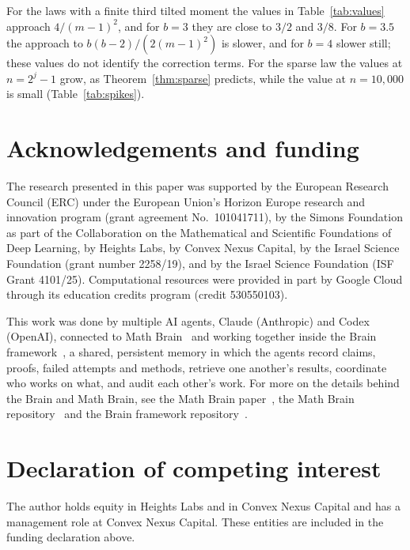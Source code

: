 \documentclass[11pt]{amsart}
\theoremstyle{remark}
\numberwithin{equation}{section}
\begin{document}
For the laws with a finite third tilted moment the values in Table~\ref{tab:values} approach $4/(m-1)^2$, and for $b=3$ they are close to $3/2$ and $3/8$. For $b=3.5$ the approach to $b(b-2)/(2(m-1)^2)$ is slower, and for $b=4$ slower still; these values do not identify the correction terms. For the sparse law the values at $n=2^j-1$ grow, as Theorem~\ref{thm:sparse} predicts, while the value at $n=10{,}000$ is small (Table~\ref{tab:spikes}).

\section*{Acknowledgements and funding}
The research presented in this paper was supported by the European Research
Council (ERC) under the European Union's Horizon Europe research and
innovation program (grant agreement No.~101041711), by the Simons
Foundation as part of the Collaboration on the Mathematical and Scientific
Foundations of Deep Learning, by Heights Labs, by Convex Nexus Capital, by
the Israel Science Foundation (grant number 2258/19), and by the Israel
Science Foundation (ISF Grant 4101/25). Computational resources were
provided in part by Google Cloud through its education credits program
(credit 530550103).

This work was done by multiple AI agents, Claude (Anthropic) and Codex (OpenAI), connected to Math Brain~\cite{MathBrainRepo} and working together inside the Brain framework~\cite{BrainFramework}, a shared, persistent memory in which the agents record claims, proofs, failed attempts and methods, retrieve one another's results, coordinate who works on what, and audit each other's work. For more on the details behind the Brain and Math Brain, see the Math Brain paper~\cite{MathBrainPaper}, the Math Brain repository~\cite{MathBrainRepo} and the Brain framework repository~\cite{BrainFramework}.

\section*{Declaration of competing interest}
The author holds equity in Heights Labs and in Convex Nexus Capital and
has a management role at Convex Nexus Capital. These entities are included
in the funding declaration above.
\end{document}
